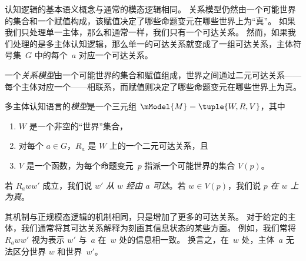 \documentclass[../../../include/open-logic-section]{subfiles}
\begin{document}


认知逻辑的基本语义概念与通常的模态逻辑相同。
关系模型仍然由一个可能世界的集合和一个赋值构成，该赋值决定了哪些命题变元在哪些世界上为“真”。
如果我们只处理单一主体，那么和通常一样，我们只有一个可达关系。
然而，如果我们处理的是多主体认知逻辑，那么单一的可达关系就变成了一组可达关系，主体符号集~$G$ 中的每个~$a$ 对应一个可达关系。

一个\emph{关系模型}由一个可能世界的集合和赋值组成，世界之间通过二元可达关系——每个主体对应一个——相联系，而赋值则决定了哪些命题变元在哪些世界上为真。

\begin{defn}
  多主体认知语言的\emph{模型}是一个三元组
  $\mModel{M} = \tuple{W, R, V}$，其中
  \begin{enumerate}
  \item $W$ 是一个非空的“世界”集合，
  \item 对每个 $a \in G$，${R}_a$ 是 $W$ 上的一个二元可达关系，且
  \item $V$ 是一个函数，为每个命题变元~$p$ 指派一个可能世界的集合 $V(p)$。
  \end{enumerate}
  若 $R_a ww'$ 成立，我们说 $w'$ \emph{从 $w$ 经由 $a$ 可达}。若 $w \in V(p)$，我们说 $p$ \emph{在 $w$ 上为真}。
\end{defn}

其机制与正规模态逻辑的机制相同，只是增加了更多的可达关系。
对于给定的主体，我们通常将其可达关系解释为刻画其信息状态的某些方面。
例如，我们常将 $R_a ww'$ 视为表示 $w'$ 与~$a$ 在~$w$ 处的信息相一致。
换言之，在~$w$ 处，主体~$a$ 无法区分世界 $w$ 和世界~$w'$。
\end{document}
